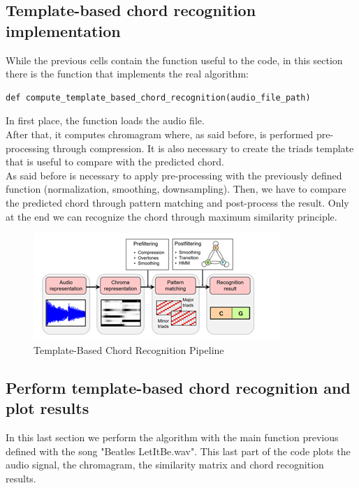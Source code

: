 \documentclass[
	12pt, %
]{fphw}
\begin{document}
\subsection{Template-based chord recognition implementation}

While the previous cells contain the function useful to the code, in this section there is the function that implements the real algorithm:\\

\begin{lstlisting}
def compute_template_based_chord_recognition(audio_file_path)
\end{lstlisting}
In first place, the function loads the audio file.\\ After that, it computes chromagram where, as said before, is performed pre-processing through compression. It is also necessary to create the triads template that is useful to compare with the predicted chord.\\
As said before is necessary to apply pre-processing with the previously defined function (normalization, smoothing, downsampling).
Then, we have to compare the predicted chord through pattern matching and post-process the result.
Only at the end we can recognize the chord through maximum similarity principle.\\

\begin{figure}[H]
 \centering
 \includegraphics[scale=1]{./images/1_template_based_pipeline.png}
 \caption{Template-Based Chord Recognition Pipeline}
\end{figure}

\subsection{Perform template-based chord recognition and plot results}

In this last section we perform the algorithm with the main function previous defined with the song "Beatles LetItBe.wav". This last part of the code plots the audio signal, the chromagram, the  similarity matrix and chord recognition results.\\
\end{document}
